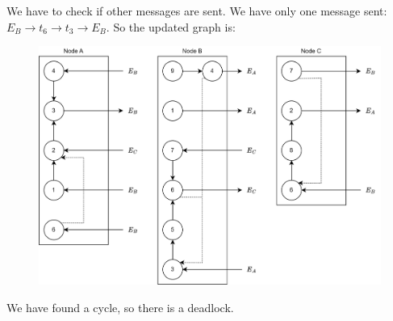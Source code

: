 We have to check if other messages are sent. 
We have only one message sent: $E_B \rightarrow t_6 \rightarrow t_3 \rightarrow E_B$. 
So the updated graph is: 
\begin{figure}[H]
    \centering
    \includegraphics[width=0.75\linewidth]{images/Ob3.png}
\end{figure}
We have found a cycle, so there is a deadlock. 